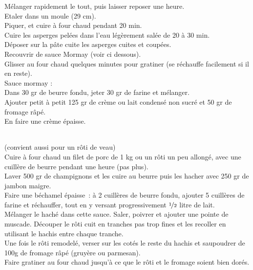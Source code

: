 \begin{minipage}[c]{\textwidth}
Mélanger rapidement le tout, puis laisser reposer une heure. \\
Etaler dans un moule (29 cm). \\
Piquer, et cuire à four chaud pendant 20 min. \\
Cuire les asperges pelées dans l’eau légèrement salée de 20 à 30 min.\\
Déposer sur la pâte cuite les asperges cuites et coupées. \\
Recouvrir de sauce Mormay (voir ci dessous).\\
Glisser au four chaud quelques minutes pour gratiner (se réchauffe facilement si il en reste).\\
Sauce mormay :\\
Dans 30 gr de beurre fondu, jeter 30 gr de farine et mélanger. \\
Ajouter petit à petit 125 gr de crème ou lait condensé non sucré et 50 gr de fromage râpé. \\
En faire une crème épaisse. \\
\\

\end{minipage}

\begin{minipage}[c]{\textwidth}
(convient aussi pour un rôti de veau)\\
Cuire à four chaud un filet de porc de 1 kg ou un rôti un peu allongé, avec une cuillère de beurre pendant une heure (pas plus).\\
Laver 500 gr de champignons et les cuire au beurre puis les hacher avec 250 gr de jambon maigre. \\
Faire une béchamel épaisse : à 2 cuillères de beurre fondu, ajouter 5 cuillères de farine et réchauffer, tout en y versant progressivement $\nicefrac{1}{2}$ litre de lait. \\
Mélanger le haché dans cette sauce. Saler, poivrer et ajouter une pointe de muscade. Découper le rôti cuit en tranches pas trop fines et les recoller en utilisant le hachis entre chaque tranche.\\
Une fois le rôti remodelé, verser sur les cotés le reste du hachis et saupoudrer de 100g de fromage râpé (gruyère ou parmesan). \\
Faire gratiner au four chaud jusqu’à ce que le rôti et le fromage soient bien dorés. \\
\\

\end{minipage}

